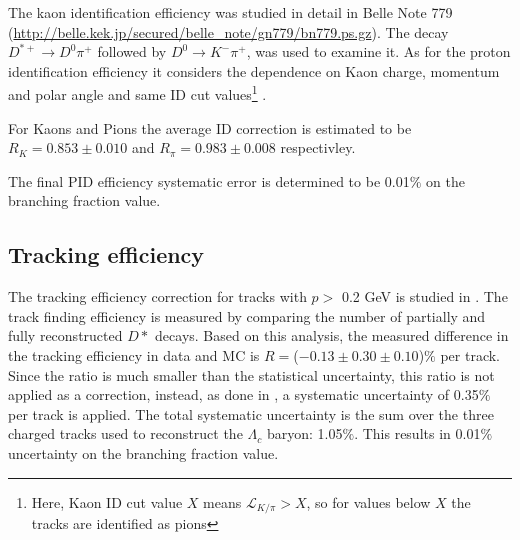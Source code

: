 \vspace{0.2 cm}
\noindent  The kaon identification efficiency was studied in detail in Belle Note 779 \cite{KIDeff} (\url{http://belle.kek.jp/secured/belle_note/gn779/bn779.ps.gz}). The decay $D^{*+} \rightarrow D^0 \pi^+$ followed by $D^0 \rightarrow K^- \pi^+$, was used to examine it. As for the proton identification efficiency it considers the dependence on Kaon charge, momentum and polar angle and same ID cut values\footnote{Here, Kaon ID cut value $X$ means $  \mathcal{L}_{K/\pi} > X$, so for values below $X$ the tracks are identified as pions} . 



\noindent For Kaons and Pions the average ID correction is estimated to be  \hspace{0.2 cm}  $R_K = 0.853 \pm 0.010$ 
 and \hspace{0.25 cm} $R_{\pi} = 0.983 \pm 0.008$  \hspace{0.25 cm} respectivley.

\noindent The final PID efficiency systematic error is determined to be  0.01$\%$ on the branching fraction value. 

\subsection{Tracking efficiency}
The tracking efficiency correction for tracks with $p > $ 0.2 GeV is studied in \cite{TrackingEff}  . The track finding efficiency is measured by comparing the number of partially and fully reconstructed
$D*$ decays. Based on this analysis, the measured difference in the tracking efficiency in data and MC is $R = $($- 0.13 \pm 0.30  \pm 0.10$)$\%$ per track.  Since the ratio is much smaller
than the statistical uncertainty, this ratio is not applied as a correction, instead, as done in \cite{BN1584}, a systematic uncertainty of 0.35$\%$ per track is applied. The total systematic uncertainty is the sum over the 
three charged tracks used to reconstruct the $\Lambda_c$ baryon: 1.05$\%$.
This results in 0.01$\%$ uncertainty on the branching fraction value. 

